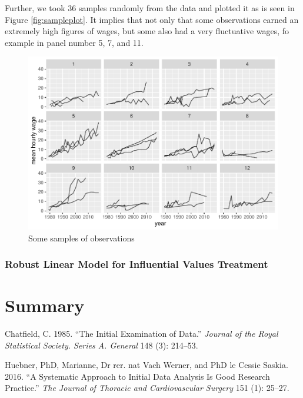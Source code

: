 \documentclass{article}
\begin{document}
Further, we took 36 samples randomly from the data and plotted it as is
seen in Figure \ref{fig:sampleplot}. It implies that not only that some
observations earned an extremely high figures of wages, but some also
had a very fluctuative wages, fo example in panel number 5, 7, and 11.

\begin{figure}
\centering
\includegraphics{report_files/figure-latex/sampleplot-1.pdf}
\caption{Some samples of observations}
\end{figure}

\hypertarget{robust-linear-model-for-influential-values-treatment}{%
\subsubsection{Robust Linear Model for Influential Values
Treatment}\label{robust-linear-model-for-influential-values-treatment}}

\hypertarget{summary}{%
\section*{Summary}\label{summary}}

\hypertarget{refs}{}
\leavevmode\hypertarget{ref-Chatfield1985TIEo}{}%
Chatfield, C. 1985. ``The Initial Examination of Data.'' \emph{Journal
of the Royal Statistical Society. Series A. General} 148 (3): 214--53.

\leavevmode\hypertarget{ref-HuebnerMariannePhD2016Asat}{}%
Huebner, PhD, Marianne, Dr rer. nat Vach Werner, and PhD le Cessie
Saskia. 2016. ``A Systematic Approach to Initial Data Analysis Is Good
Research Practice.'' \emph{The Journal of Thoracic and Cardiovascular
Surgery} 151 (1): 25--27.
\end{document}

